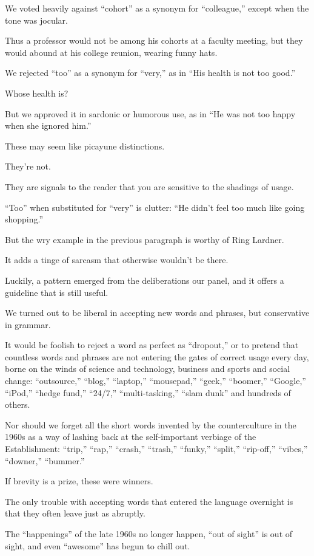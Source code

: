 \documentclass{book}
\numberwithin{equation}{section}
\begin{document}
We voted heavily against ``cohort'' as a synonym for ``colleague,'' except when the tone was jocular.

Thus a professor would not be among his cohorts at a faculty meeting, but they would abound at his college reunion, wearing funny hats.

We rejected ``too'' as a synonym for ``very,'' as in ``His health is not too good.''

Whose health is?

But we approved it in sardonic or humorous use, as in ``He was not too happy when she ignored him.''

%
These may seem like picayune distinctions.

They're not.

They are signals to the reader that you are sensitive to the shadings of usage.

``Too'' when substituted for ``very'' is clutter: ``He didn't feel too much like going shopping.''

But the wry example in the previous paragraph is worthy of Ring Lardner.

It adds a tinge of sarcasm that otherwise wouldn't be there.

%
Luckily, a pattern emerged from the deliberations our panel, and it offers a guideline that is still useful.

We turned out to be liberal in accepting new words and phrases, but conservative in grammar.

%
It would be foolish to reject a word as perfect as ``dropout,'' or to pretend that countless words and phrases are not entering the gates of correct usage every day, borne on the winds of science and technology, business and sports and social change: ``outsource,'' ``blog,'' ``laptop,'' ``mousepad,'' ``geek,'' ``boomer,'' ``Google,'' ``iPod,'' ``hedge fund,'' ``24/7,'' ``multi-tasking,'' ``slam dunk'' and hundreds of others.

Nor should we forget all the short words invented by the counterculture in the 1960s as a way of lashing back at the self-important verbiage of the Establishment: ``trip,'' ``rap,'' ``crash,'' ``trash,'' ``funky,'' ``split,'' ``rip-off,'' ``vibes,'' ``downer,'' ``bummer.''

If brevity is a prize, these were winners.

The only trouble with accepting words that entered the language overnight is that they often leave just as abruptly.

The ``happenings'' of the late 1960s no longer happen, ``out of sight'' is out of sight, and even ``awesome'' has begun to chill out.
\end{document}
